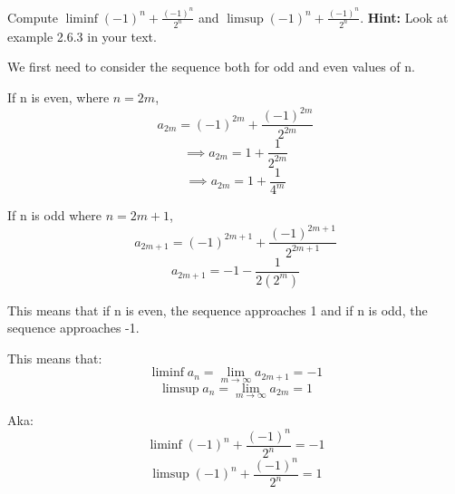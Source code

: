 \documentclass[answers]{exam}
\theoremstyle{remark}
\theoremstyle{definition}
\begin{document}
\begin{questions}
\begin{solution}
\end{solution}

\question Compute $\liminf (-1)^n+\frac{(-1)^n}{2^n}$ and $\limsup(-1)^n+\frac{(-1)^n}{2^n}$. \textbf{Hint:} Look at example 2.6.3 in your text.
\begin{solution}

We first need to consider the sequence both for odd and even values of n.

If n is even, where $n = 2m$,
\[a_{2m} = (-1)^{2m} + \frac{(-1)^{2m}}{2^{2m}}\]
\[\implies a_{2m} = 1 + \frac{1}{2^{2m}}\]
\[\implies a_{2m} = 1 + \frac{1}{4^m}\]

If n is odd where $n = 2m + 1$,
\[a_{2m+1} = (-1)^{2m+1} + \frac{(-1)^{2m+1}}{2^{2m+1}}\]
\[a_{2m+1} = -1 - \frac{1}{2(2^m)}\]

This means that if n is even, the sequence approaches 1 and
if n is odd, the sequence approaches -1.

This means that:
\[\liminf a_n = \lim_{m \to \infty} a_{2m+1} = -1\]
\[\limsup a_n = \lim_{m \to \infty} a_{2m} = 1\]

Aka:
\[\liminf (-1)^n+\frac{(-1)^n}{2^n} = -1\]
\[\limsup(-1)^n+\frac{(-1)^n}{2^n} = 1\]


\end{solution}


\end{questions}
\end{document}
